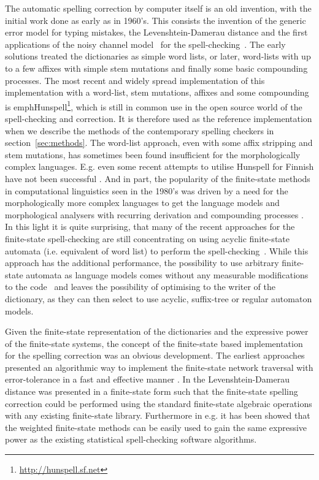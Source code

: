\documentclass[a4paper,12pt]{article}
\begin{document}
The automatic spelling correction by computer itself is an old invention, with
the initial work done as early as in 1960's. This consists the invention of the
generic error model for typing mistakes, the Levenshtein-Damerau distance
\cite[]{levenshtein/1966,damerau/1964} and the first applications of the noisy
channel model~\cite[]{shannon/1948} for the spell-checking~\cite[]{raviv/1967}.
The early solutions treated the dictionaries as simple word lists, or later,
word-lists with up to a few affixes with simple stem mutations and finally some
basic compounding processes. The most recent and widely spread implementation
of this implementation with a word-list, stem mutations, affixes and some
compounding is emph{Hunspell}\footnote{\url{http://hunspell.sf.net}}, which is
still in common use in the open source world of the spell-checking and
correction.  It is therefore used as the reference implementation when we
describe the methods of the contemporary spelling checkers in
section~\ref{sec:methods}. The word-list approach, even with some affix
stripping and stem mutations, has sometimes been found insufficient for the
morphologically complex languages.  E.g. even some recent attempts to utilise
Hunspell for Finnish have not been successful \cite[]{pitkanen/2006}. And in
part, the popularity of the finite-state methods in computational linguistics
seen in the 1980's was driven by a need for the morphologically more complex
languages to get the language models and morphological analysers with recurring
derivation and compounding processes \cite[]{beesley2004morphological}.  In
this light it is quite surprising, that many of the recent approaches for the
finite-state spell-checking are still concentrating on using acyclic
finite-state automata (i.e. equivalent of word list) to perform the
spell-checking~\cite[]{watson2003new,deorowicz2005correcting}. While this
approach has the additional performance, the possibility to use arbitrary
finite-state automata as language models comes without any measurable
modifications to the code~\cite[e.g.][]{pirinen/2010/lrec} and leaves the
possibility of optimising to the writer of the dictionary, as they can then
select to use acyclic, suffix-tree or regular automaton models.

Given the  finite-state representation of the dictionaries and the expressive
power of the finite-state systems, the concept of the finite-state based
implementation for the spelling correction was an obvious development. The
earliest approaches presented an algorithmic way to implement the finite-state
network traversal with error-tolerance \cite[]{oflazer/1996} in a fast and
effective manner \cite[]{agata/2002,hulden/2009}.  In \cite{schulz/2002} the
Levenshtein-Damerau distance was presented in a finite-state form such that the
finite-state spelling correction could be performed using the standard
finite-state algebraic operations with any existing finite-state library.
Furthermore in e.g.  \cite{pirinen/2010/lrec} it has been showed that the
weighted finite-state methods can be easily used to gain the same expressive
power as the existing statistical spell-checking software algorithms.
\end{document}

